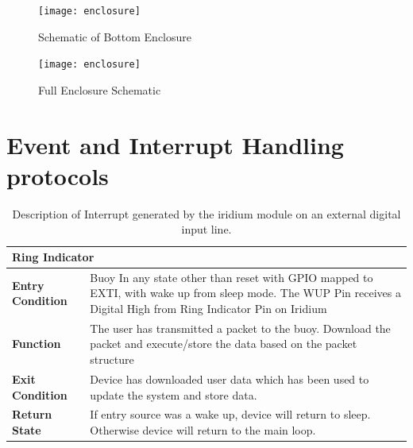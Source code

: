 \begin{figure}[H]
    \centering
\texttt{[image: enclosure]}
    \caption{Schematic of Bottom Enclosure}
    \label{fig:conblock_schem}
\end{figure}

\begin{figure}[H]
    \centering
\texttt{[image: enclosure]}
    \caption{Full Enclosure Schematic}
    \label{fig:full_schem}
\end{figure}

\chapter{Event and Interrupt Handling protocols} 
\label{sec:evt}

\begin{table}[H]
    \centering
    \caption{Description of Interrupt generated by the iridium module on an external digital input line.}
    \begin{tabular}{|m{}|m{}|}
    \hline
        \multicolumn{2}{|l|}{\textbf{Ring Indicator}} \\
        \hline
       \textbf{Entry Condition}  &  Buoy In any state other than reset with GPIO mapped to EXTI, with wake up from sleep mode. The WUP Pin receives a Digital High from Ring Indicator Pin on Iridium\\
       \hline
      \textbf{Function} &  The user has transmitted a packet to the buoy. Download the packet and execute/store the data based on the packet structure\\
       \hline
       \textbf{Exit Condition} & Device has downloaded user data which has been used to update the system and store data.\\
       \hline
       \textbf{Return State}& If entry source was a wake up, device will return to sleep. Otherwise device will return to the main loop.\\
       \hline
    \end{tabular}

    \label{tab:Int_desc_RI}
\end{table}

